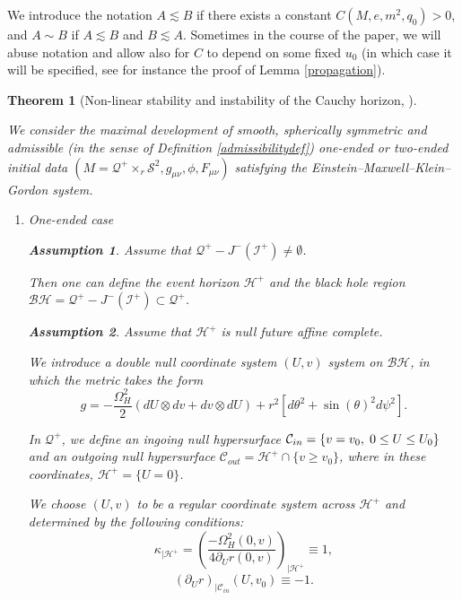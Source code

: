 \documentclass[10pt,a4paper]{article}
\theoremstyle{plain}
\newtheorem{thm}{Theorem}[section]
\theoremstyle{remark}
\theoremstyle{definition}
\newtheorem{hyp}{Assumption}
\theoremstyle{plain}
\theoremstyle{remark}
\theoremstyle{definition}
\numberwithin{equation}{section}
\begin{document}
We introduce the notation $A \lesssim B$ if there exists a constant $C(M, e, m^2, q_0)>0$, and $A \sim B$ if  $A \lesssim B$ and  $B \lesssim A$. Sometimes in the course of the paper, we will abuse notation and allow also for $C$ to depend on some fixed $u_0$ (in which case it will be specified, see for instance the proof of Lemma \ref{propagation}).\color{black}
\begin{thm}[Non-linear stability and instability of the Cauchy horizon, \cite{Moi}] \label{previous}
	
	
	
	
	
	
	We consider the maximal development of smooth, spherically symmetric and admissible (in the sense of Definition \ref{admissibilitydef}) one-ended or two-ended initial data  $(M=\mathcal{Q}^+ \times_r \mathcal{S}^2,g_{\mu \nu}, \phi,F_{\mu \nu})$ satisfying the Einstein--Maxwell--Klein--Gordon system. 
	\begin{enumerate}
		\item One-ended case
		
		
		
		\begin{hyp} \label{blackholehyp}
			Assume that $\mathcal{Q}^+-J^{-}(\mathcal{I}^+) \neq \emptyset$.
		\end{hyp}
		
		Then one can define the event horizon $\mathcal{H}^+$ and the black hole region $\mathcal{BH}=\mathcal{Q}^+-J^{-}(\mathcal{I}^+) \subset \mathcal{Q}^+$.
		
		\begin{hyp} \label{affinecomplete}
			Assume that $\mathcal{H}^+$ is null future affine complete.
		\end{hyp}
		
		We introduce a double null coordinate system $(U,v)$ system on $\mathcal{BH}$, in which the metric takes the form $$ g =  - \frac{\Omega^{2}_H}{2} (dU  \otimes dv+dv  \otimes dU)+r^{2}[ d\theta^{2}+\sin(\theta)^{2}d \psi^{2}].$$
		
		In $\mathcal{Q}^+$, we define an ingoing null hypersurface $\mathcal{C}_{in}= \{ v=v_0, \hskip 1 mm 0 \leq U \leq U_0\}$ and an outgoing null hypersurface $ \mathcal{C}_{out}=\mathcal{H}^+ \cap  \{v \geq v_0\}$, where in these coordinates, $\mathcal{H}^+= \{ U=0\}$.
		
		We choose $(U,v)$ to be a regular coordinate  system across $\mathcal{H}^+$ and determined by the following conditions:	\begin{equation} \label{gauge2}
		\kappa_{|\mathcal{H}^+} = (\frac{-\Omega^2_{H}(0,v)}{4\partial_{U}r(0, v)})_{|\mathcal{H}^+}\equiv 1,
		\end{equation}    \begin{equation} \label{gauge1}
		(\partial_{U}r)_{|\mathcal{C}_{in}}(U, v_0) \equiv -1.
		\end{equation}
		

\end{enumerate}
\end{thm}
\end{document}
